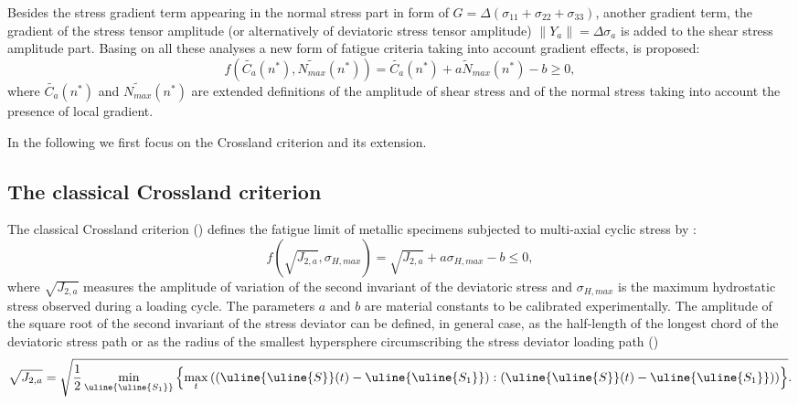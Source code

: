 Besides the stress gradient term appearing in the normal stress part in form of $G=\Delta(\sigma_{11}+\sigma_{22}+\sigma_{33})$, another gradient term, the gradient of the stress tensor amplitude (or alternatively of deviatoric stress tensor amplitude) $\parallel{Y}_a\parallel={\Delta\sigma}_a$ is added to the shear stress amplitude part. Basing on all these analyses a new form of fatigue criteria taking into account gradient effects, is proposed:
\begin{equation}
	f(\widetilde{C_a}(n^*),\widetilde{N_{max}}(n^*))=\widetilde{C_a}(n^*)+a\widetilde{N}_{max}(n^*)-b\geqslant 0 ,
	\label{eq:gradient crossland}
\end{equation}
where $\widetilde{C_a}(n^*)$ and $\widetilde{N_{max}}(n^*)$ are extended definitions of the amplitude of shear stress and of the normal stress taking into account the presence of local gradient.

In the following we first focus on the Crossland criterion and its extension.

\subsection{The classical Crossland criterion}

The classical Crossland criterion (\cite{crossland1956effect}) defines the fatigue limit of metallic specimens subjected to multi-axial cyclic stress  by : 
\begin{equation}
	f(\sqrt{J_{2,a}},\sigma_{H,max})=\sqrt{J_{2,a}}+a\sigma_{H,max}-b\leqslant 0,\label{eq:crossland}
\end{equation}
where $\sqrt{J_{2,a}}$ measures  the amplitude of variation of the second invariant of the deviatoric stress  and $\sigma_{H,max}$ is the maximum hydrostatic stress observed during a loading cycle. The parameters $a$ and $b$ are material constants to be calibrated experimentally. The amplitude of the square root of the second invariant of the stress deviator can be defined, in general case, as the half-length of the longest chord of the deviatoric stress path or as the radius of the smallest hypersphere circumscribing the stress deviator loading path (\cite{Papadopoulos1997219})
\begin{equation}\sqrt{J_{2,a}}=\sqrt{\frac{1}{2}\min \limits_{\uline{\uline{S_1}}}\left\lbrace \max \limits_{t}\left( (\uline{\uline{S}}(t)-\uline{\uline{S_1}}):(\uline{\uline{S}}(t)-\uline{\uline{S_1}})\right) \right\rbrace }.\end{equation}

